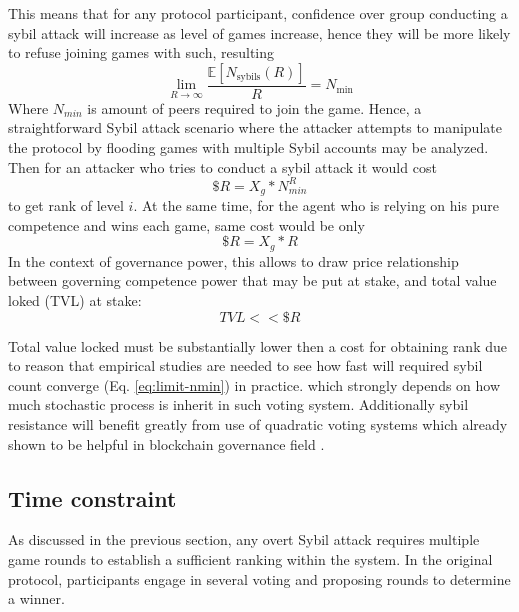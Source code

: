 \documentclass{article}
\begin{document}
\begin{CJK}{UTF8}{gbsn}
\begin{multicols}{2}
            This means that for any protocol participant, confidence over group conducting a sybil attack will increase as level of games increase, hence they will be more likely to refuse joining games with such, resulting
            \begin{equation}
                \lim_{R \to \infty} \frac{\mathbb{E}[N_{\text{sybils}}(R)]}{R} = N_{\text{min}}
                \label{eq:limit-nmin}
            \end{equation} Where $N_{min}$ is amount of peers required to join the game. Hence, a straightforward Sybil attack scenario where the attacker attempts to manipulate the protocol by flooding games with multiple Sybil accounts may be analyzed.
            Then for an attacker who tries to conduct a sybil attack it would cost
            \begin{equation}
                \$R = X_g*N_{min}^R
            \end{equation}
            to get rank of level $i$. At the same time, for the agent who is relying on his pure competence and wins each game, same cost would be only \begin{equation}
                \$R = X_g*R
            \end{equation}
            In the context of governance power, this allows to draw price relationship between governing competence power that may be put at stake, and total value loked (TVL) at stake:
            \begin{equation}
                TVL << \$R
            \end{equation}

            Total value locked must be substantially lower then a cost for obtaining rank due to reason that empirical studies are needed to see how fast will required sybil count converge (Eq. \ref{eq:limit-nmin}) in practice. which strongly depends on how much stochastic process is inherit in such voting system. Additionally sybil resistance will benefit greatly from use of quadratic voting systems which already shown to be helpful in blockchain governance field \cite{Buterin20}\cite{Benhaim2024}.


            \subsection{Time constraint}
            \label{sec:time-constraint}

            As discussed in the previous section, any overt Sybil attack requires multiple game rounds to establish a sufficient ranking within the system. In the original protocol, participants engage in several voting and proposing rounds to determine a winner.


\end{multicols}
\end{CJK}
\end{document}
